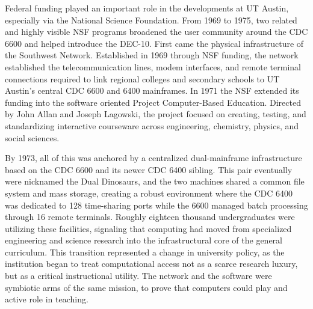 Federal funding played an important role in the developments at UT Austin, especially via the National Science Foundation. From 1969 to 1975, two related and highly visible NSF programs broadened the user community around the CDC 6600 and helped introduce the DEC-10. First came the physical infrastructure of the Southwest Network. Established in 1969 through NSF funding, the network established the telecommunication lines, modem interfaces, and remote terminal connections required to link regional colleges and secondary schools to UT Austin's central CDC 6600 and 6400 mainframes. In 1971 the NSF extended its funding into the software oriented Project Computer-Based Education. Directed by John Allan and Joseph Lagowski, the project focused on creating, testing, and standardizing interactive courseware across engineering, chemistry, physics, and social sciences. \cite{warlickComputersInstruction1973}

By 1973, all of this was anchored by a centralized dual-mainframe infrastructure based on the CDC 6600 and its newer CDC 6400 sibling. This pair eventually were nicknamed the Dual Dinosaurs, and the two machines shared a common file system and mass storage, creating a robust environment where the CDC 6400 was dedicated to 128 time-sharing ports while the 6600 managed batch processing through 16 remote terminals. Roughly eighteen thousand undergraduates were utilizing these facilities, signaling that computing had moved from specialized engineering and science research into the infrastructural core of the general curriculum. This transition represented a change in university policy, as the institution began to treat computational access not as a scarce research luxury, but as a critical instructional utility. The network and the software were symbiotic arms of the same mission, to prove that computers could play and active role in teaching. \cite{allanGeneralInformationProject1972} \cite{mullerUseBilingualWorkshop1973}

